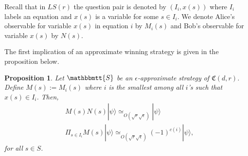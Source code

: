 \documentclass[11pt,letterpaper]{article}
\newcommand{\ket}[1]{|#1\rangle}
\newcommand{\1}{\mathbb{1}}
\newcommand{\LS}{LS}
\newcommand{\fC}{\mathfrak{C}}
\newcommand{\bS}{\mathbbmtt{S}}
\newcommand{\ep}{\epsilon}
\newcommand{\se}{\sqrt{\epsilon}}
\newcommand{\sr}{\sqrt{r}}
\newcommand{\appd}[1]{\simeq_{#1}}
\newtheorem{proposition}[theorem]{Proposition}
\theoremstyle{definition}
\begin{document}
Recall that in $\LS(r)$ the question pair is denoted by $(I_i,x(s))$ where $I_i$ 
labels an equation and $x(s)$ is a variable for some $s \in I_i$. 
We denote 
Alice's observable for variable $x(s)$ in equation $i$ by $M_i(s)$ and
Bob's observable for variable $x(s)$ by $N(s)$. 

The first implication of an approximate winning strategy is given in the proposition below.
\begin{proposition}
	\label{prop:lct_base}
	Let $\bS$ be an $\ep$-approximate strategy of $\fC(d,r)$.
	Define $M(s) := M_i(s)$ where 
	$i$ is the smallest among all $i$'s
	such that $x(s) \in I_i$.
	Then, 
	\begin{align}
		&M(s) N(s) \ket{\psi} \appd{O(\sr\se)} \ket{\psi} \\
		&\Pi_{s \in I_i} M(s) \ket{\psi} \appd{O(\sr\se)}(-1)^{c(i)} \ket{\psi},
	\end{align}
	for all $s \in S$.
\end{proposition}
\end{document}
